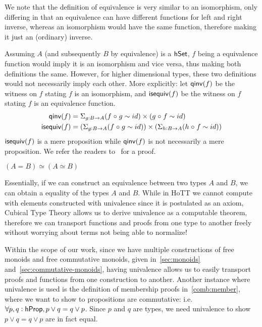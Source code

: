 We note that the definition of equivalence is very similar to
an isomorphism, only differing in that an equivalence can have
different functions for left and right inverse, whereas an isomorphism
would have the same function, therefore making it just an (ordinary) inverse.

Assuming $A$ (and subsequently $B$ by equivalence) is a $\mathsf{hSet}$,
$f$ being a equivalence function would imply it is an isomorphism and 
vice versa, thus making both definitions the same. However, for higher
dimensional types, these two definitions would not necessarily imply
each other.
More explicitly: let $\operatorname{\mathsf{qinv}}(f)$
be the witness on $f$
stating $f$ is an isomorphism, and $\operatorname{\mathsf{isequiv}}(f)$ be the witness on
$f$ stating $f$ is an equivalence function.
\begin{align*}
\operatorname{\mathsf{qinv}}(f) & = \Sigma_{g : B \to A}(f \mathrel{\circ} g \sim id)\times(g \mathrel{\circ} f \sim id) \\
\operatorname{\mathsf{isequiv}}(f) & = (\Sigma_{g : B \to A}(f \mathrel{\circ} g \sim id))\times(\Sigma_{h : B \to A}(h \mathrel{\circ} f \sim id))
\end{align*}
$\operatorname{\mathsf{isequiv}}(f)$ is a mere proposition while $\operatorname{\mathsf{qinv}}(f)$ is not
necessarily a mere proposition.
We refer the readers
to~\cite[Chapter 4.1]{univalentfoundationsprogramHomotopyTypeTheory2013} for a proof.

\begin{definition}
    $(A = B) \simeq (A \simeq B)$
\end{definition}
Essentially, if we can construct an equivalence between two types $A$ and $B$,
we can obtain a equality of the types $A$ and $B$. While in HoTT we cannot
compute with elements constructed with univalence since it is postulated as an
axiom, Cubical Type Theory allows us to derive univalence as a computable
theorem, therefore we can transport functions and proofs from one type to
another freely without worrying about terms not being able to normalize!

Within the scope of our work, since we have multiple constructions of free monoids
and free commutative monoids, given in~\cref{sec:monoids} and~\cref{sec:commutative-monoids},
having univalence allows us to easily transport proofs and functions from one construction to another.
Another instance where univalence is used is the definition of membership proofs in~\cref{comb:member},
where we want to show to propositions are commutative: i.e. $\forall p, q: \mathsf{hProp}, p \vee q = q \vee p$.
Since $p$ and $q$ are types, we need univalence to show $p \vee q = q \vee p$ are in fact equal.


